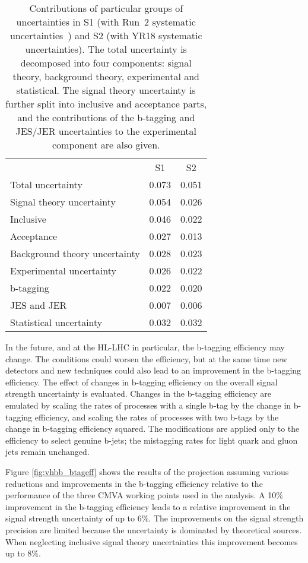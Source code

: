 \begin{table}[th!]
\begin{center}
{
\caption{Contributions of particular groups of uncertainties in S1 (with Run~2 systematic uncertainties~\cite{HIG16044}) and S2 (with YR18 systematic uncertainties). The total uncertainty is decomposed into four components: signal theory, background theory, experimental and statistical. The signal theory uncertainty is further split into inclusive and acceptance parts, and the contributions of the b-tagging and JES/JER uncertainties to the experimental component are also given.}
\label{tab:vhbb_uncertbreakdown}
\begin{tabular}{l c c}
 & S1 & S2\\
Total uncertainty   & 0.073  & 0.051 \\
\hline
Signal theory uncertainty& 0.054 & 0.026\\
\quad Inclusive & 0.046 &0.022\\
\quad Acceptance & 0.027 &0.013\\
Background theory uncertainty & 0.028 & 0.023\\
Experimental uncertainty & 0.026 & 0.022 \\
\quad b-tagging & 0.022  & 0.020 \\
\quad JES and JER & 0.007  & 0.006 \\
Statistical uncertainty & 0.032 & 0.032\\
\end{tabular}
} %
\end{center}
\end{table}

In the future, and at the HL-LHC in particular, the b-tagging efficiency may change. The conditions could worsen the efficiency, but
at the same time new detectors and new techniques could also lead to an improvement in the b-tagging efficiency. 
The effect of changes in b-tagging efficiency on the overall signal strength uncertainty is evaluated. Changes in the b-tagging
efficiency are emulated by scaling the rates of processes with a single b-tag by the change in b-tagging efficiency, and scaling the 
rates of processes with two b-tags by the change in b-tagging efficiency squared. The modifications are applied only to the efficiency to select genuine b-jets; the mistagging rates for light quark and gluon jets remain unchanged.

Figure \ref{fig:vhbb_btageff} shows the results of the projection assuming various reductions and improvements in the b-tagging efficiency relative to the performance of the three CMVA working points used in the analysis.
A 10\% improvement in the b-tagging efficiency leads to a relative improvement in the signal strength uncertainty of up to 6\%. The improvements on the signal strength precision are limited because the uncertainty is dominated by theoretical sources. When neglecting inclusive signal theory uncertainties this improvement becomes up to 8\%. 


